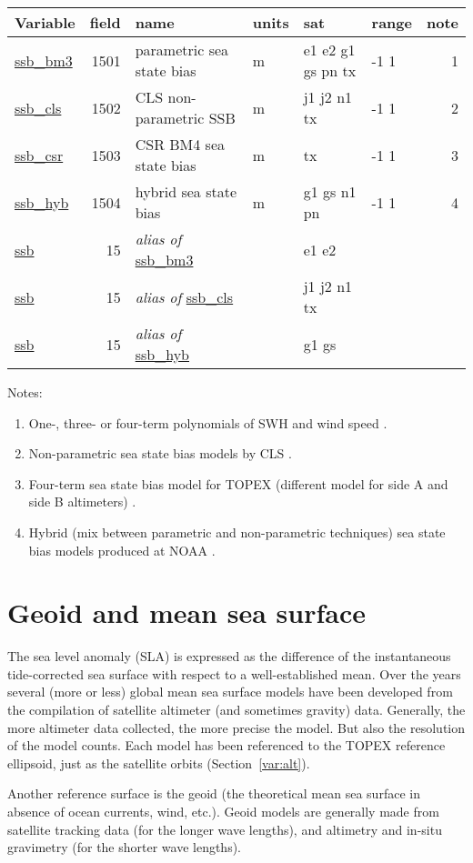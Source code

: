 \documentclass[a4paper,11pt,openany,natbib]{thesis}
\makeatletter
\newcommand\var[1]{\url{#1}\index{variables!#1@\protect\url{#1}}}
\newcommand\alias[1]{\emph{alias of} \var{#1}}
\newenvironment{vartable}{
\begin{table}[ht]
\small
\begin{tabular}{lrllllr}
\hline
Variable & field & name & units & sat & range & note \\
\hline
}{
\hline
\end{tabular}
\end{table}
}
\makeatother
\begin{document}
\begin{vartable}
\var{ssb_bm3} & 1501 & parametric sea state bias & m & e1 e2 g1 gs pn tx & -1 1 & 1 \\
\var{ssb_cls} & 1502 & CLS non-parametric SSB & m & j1 j2 n1 tx       & -1 1 & 2 \\
\var{ssb_csr} & 1503 & CSR BM4 sea state bias & m & tx                & -1 1 & 3 \\
\var{ssb_hyb} & 1504 & hybrid sea state bias  & m & g1 gs n1 pn       & -1 1 & 4 \\
\hline
\var{ssb}     &   15 & \alias{ssb_bm3} && e1 e2 && \\
\var{ssb}     &   15 & \alias{ssb_cls} && j1 j2 n1 tx && \\
\var{ssb}     &   15 & \alias{ssb_hyb} && g1 gs && \\
\end{vartable}

Notes:
\begin{enumerate}
\item One-, three- or four-term polynomials of SWH and wind speed \citep{gaspar1994a}.
\item Non-parametric sea state bias models by CLS \citep{gaspar2002,labroue2004}.
\item Four-term sea state bias model for TOPEX (different model for side A and side B altimeters) \citep{chambers2003a}.
\item Hybrid (mix between parametric and non-parametric techniques) sea state bias models produced at NOAA \citep{scharroo2005e}.
\end{enumerate}

\section{Geoid and mean sea surface}
\label{var:geoid}\label{var:mss}
The sea level anomaly (SLA) is expressed as the difference of the instantaneous tide-corrected sea surface with respect to a well-established mean. Over the years several (more or less) global mean sea surface models have been developed from the compilation of satellite altimeter (and sometimes gravity) data. Generally, the more altimeter data collected, the more precise the model. But also the resolution of the model counts. Each model has been referenced to the TOPEX reference ellipsoid, just as the satellite orbits (Section~\ref{var:alt}).

Another reference surface is the geoid (the theoretical mean sea surface in absence of ocean currents, wind, etc.). Geoid models are generally made from satellite tracking data (for the longer wave lengths), and altimetry and in-situ gravimetry (for the shorter wave lengths).
\end{document}
